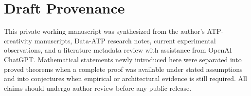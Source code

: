 \documentclass[11pt]{article}
\theoremstyle{datatheorem}
\theoremstyle{definition}
\begin{document}
\section*{Draft Provenance}
This private working manuscript was synthesized from the author's ATP-creativity manuscripts, Data-ATP research notes, current experimental observations, and a literature metadata review with assistance from OpenAI ChatGPT. Mathematical statements newly introduced here were separated into proved theorems when a complete proof was available under stated assumptions and into conjectures when empirical or architectural evidence is still required. All claims should undergo author review before any public release.
\end{document}
